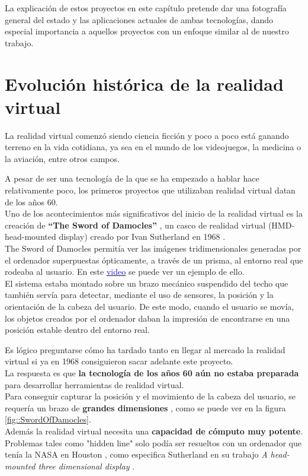 \documentclass[twoside, 11pt]{epstfg}
\begin{document}
La explicación de estos proyectos en este capítulo pretende dar una fotografía general del estado y las aplicaciones actuales de ambas tecnologías, dando especial importancia a aquellos proyectos con un enfoque similar al de nuestro trabajo.

\section{Evolución histórica de la realidad virtual}
La realidad virtual comenzó siendo ciencia ficción y poco a poco está ganando terreno en la vida cotidiana, ya sea en el mundo de los videojuegos, la medicina o la aviación, entre otros campos.

A pesar de ser una tecnología de la que se ha empezado a hablar hace relativamente poco, los primeros proyectos que utilizaban realidad virtual datan de los años 60.\\
Uno de los  acontecimientos más significativos del inicio de la realidad virtual es la creación de \textbf{“The Sword of Damocles”} , un casco de realidad virtual (HMD- head-mounted display)  creado por Ivan Sutherland en 1968 \cite{Sutherland}.\\
The Sword of Damocles permitía ver las imágenes tridimensionales generadas por el
ordenador superpuestas ópticamente, a través de un prisma, al entorno real que rodeaba al usuario. En este \href{https://www.youtube.com/watch?v=ISJWZpFIAlQ}{\textcolor{blue}{video}} se puede ver un ejemplo de ello.\\
 El sistema estaba montado sobre un brazo mecánico suspendido del techo que también servía para detectar, mediante el uso de sensores, la posición y la orientación de la cabeza del usuario. De este modo, cuando el usuario se movía, los objetos creados por el ordenador daban la impresión de encontrarse en una posición estable dentro del entorno real.

Es lógico preguntarse cómo ha tardado tanto en llegar al mercado la realidad virtual si ya en 1968 consiguieron sacar adelante este proyecto.\\
La respuesta es que \textbf{la tecnología de los años 60 aún no estaba preparada} para desarrollar herramientas de realidad virtual.\\
Para conseguir capturar la posición y el movimiento de la cabeza del usuario, se requería un brazo de \textbf{grandes dimensiones} , como se puede ver en la figura \ref{fig::SwordOfDamocles}.\\
Además la realidad virtual necesita una \textbf{capacidad de cómputo muy potente}. Problemas tales como "hidden line" solo podía ser resueltos con un ordenador que tenía la NASA en Houston \cite{hedgley1982general}, como especifica Sutherland en su trabajo \textit{A head-mounted three dimensional display} \cite{Sutherland}. 
\end{document}
